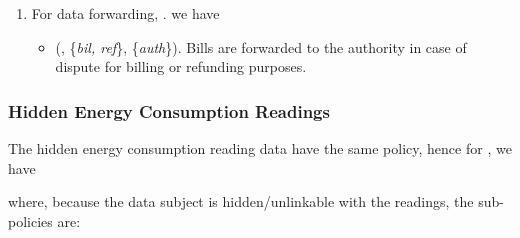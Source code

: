 \documentclass[a4paper]{article}
\begin{document}
\begin{enumerate}
\item For data forwarding, . we have  

\begin{itemize}
\item (, \{\textit{bil, ref}\}, \{\textit{auth}\}). Bills are forwarded to the authority in case of dispute for billing or refunding purposes.
\end{itemize}   

\end{enumerate} 


\subsubsection{Hidden Energy Consumption Readings} 
The hidden energy consumption reading data have the same policy, hence for , we have 

\begin{center}
\noindent\fbox{\parbox{6.7cm}{\ \ \ \ \ \   (, , , , )     
     }
}
\end{center}  

where, because the data subject is hidden/unlinkable with the readings, the sub-policies are:  
\end{document}
